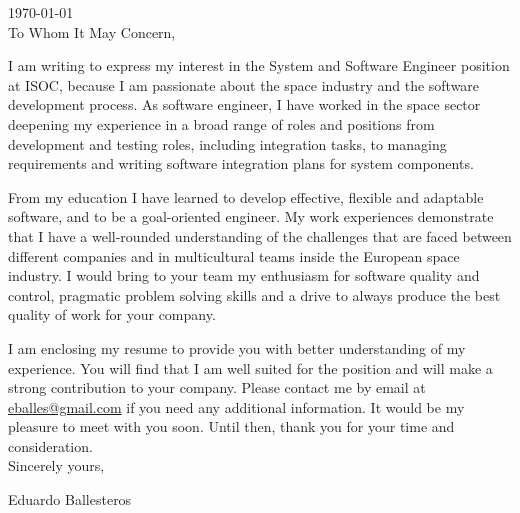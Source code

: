 \documentclass[11pt,a4paper,twoside]{moderncv}
\newcommand{\position}{System and Software Engineer} %
\newcommand{\company}{ISOC} %
\newcommand{\pollo}{To Whom It May Concern,} %
\newcommand{\companyAddress}{ }
\begin{document}
\maketitle

\noindent \today \\[1em]


\noindent \pollo

I am writing to express my interest in the {\position} position at {\company}, 
because 
I am passionate about the space industry and the software development
process. As software engineer, I have worked in the space sector deepening
my experience in a broad range of roles and positions from development and 
testing roles, including integration tasks, to managing requirements and 
writing software integration plans for system components.

From my education I have learned to develop effective, flexible and adaptable software,
and to be a goal-oriented engineer. My work experiences demonstrate that I have a 
well-rounded understanding of the challenges that are faced between different companies 
and in multicultural teams inside the European space industry. I would bring
to your team my enthusiasm for software quality and control, pragmatic problem
solving skills and a drive to always produce the best quality of work for your
company.

I am enclosing my resume to provide you with better understanding
of my experience. You will find that I am well suited for the position and
will make a strong contribution to your company. Please contact me by email at
\url{eballes@gmail.com} if you need any additional information. It would
be my pleasure to meet with you soon. Until then, thank you for your time and
consideration.\\[1.4ex]

\noindent Sincerely yours,

\noindent Eduardo Ballesteros\\[2.4ex]
\end{document}
